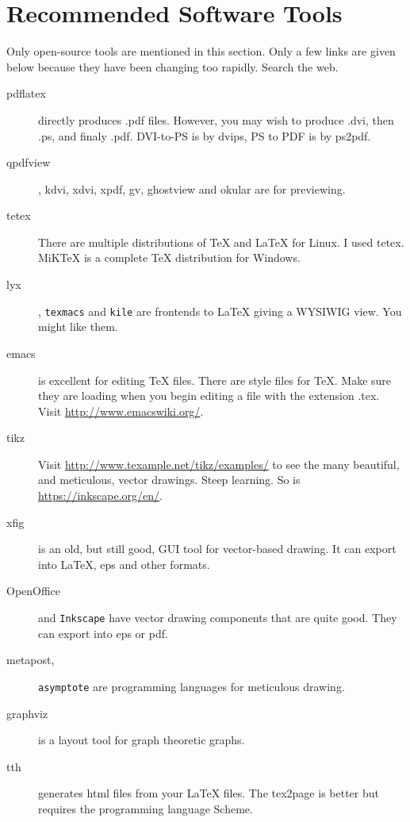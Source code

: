 \chapter{Recommended Software Tools}

Only open-source tools are mentioned in this section.  Only a few
links are given below because they have been changing too rapidly.
Search the web.

\begin{description}

\item[{pdflatex}] directly produces .pdf files.  However, you may wish
  to produce .dvi, then .ps, and finaly .pdf.  DVI-to-PS is by dvips,
  PS to PDF is by ps2pdf.

\item[{qpdfview}], kdvi, xdvi, xpdf, gv, ghostview and okular are for
  previewing.

\item[tetex]There are multiple distributions of \TeX{} and \LaTeX{}
  for Linux.  I used tetex. {MiKTeX} is a complete \TeX{} distribution
  for Windows.

\item[lyx], {\tt texmacs} and {\tt kile} are frontends to \LaTeX{}
  giving a WYSIWIG view.  You might like them.

\item[{emacs}] is excellent for editing TeX files.  There are
  style files for TeX.  Make sure they are loading when you begin
  editing a file with the extension .tex.  Visit
  \url{http://www.emacswiki.org/}.

\item[tikz] Visit \url{http://www.texample.net/tikz/examples/} to see
  the many beautiful, and meticulous, vector drawings.  Steep
  learning.  So is \url{https://inkscape.org/en/}.

\item[xfig] is an old, but still good, GUI tool for vector-based
  drawing.  It can export into \LaTeX{}, eps and other formats.

\item [OpenOffice] and {\tt Inkscape} have vector drawing components
  that are quite good.  They can export into eps or pdf.

\item [{metapost},] {\tt asymptote} are programming languages for
  meticulous drawing.

\item[{graphviz}] is a layout tool for graph theoretic graphs.

\item[{tth}] generates {\sc html} files from your LaTeX files.
  The {tex2page} is better but requires the programming language
  Scheme.

\end{description}

